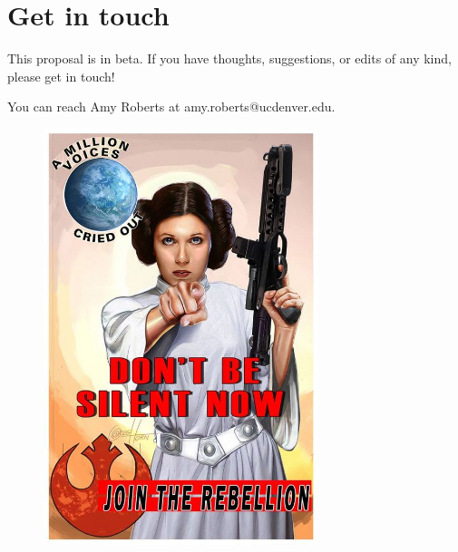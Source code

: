 \documentclass[]{report}   %
\begin{document}
\section*{Get in touch}
This proposal is in beta.  If you have thoughts, suggestions, or edits of any kind, please get in touch!

You can reach Amy Roberts at amy.roberts@ucdenver.edu.

\vspace*{\fill}
{
\begin{figure}[h]
\includegraphics[width=8cm]{mascot.jpg}
\centering
\end{figure}
}
\vspace*{\fill}
\end{document}
